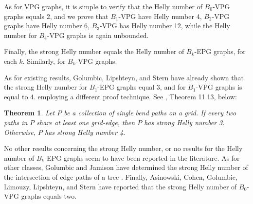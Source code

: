\documentclass[12pt]{article}
\newtheorem{theorem}{Theorem}
\begin{document}
As for VPG graphs, it is simple to verify that the Helly number of $B_0$-VPG graphs equals 2, and we prove that $B_1$-VPG have Helly number 4, $B_2$-VPG graphs have Helly number 6, $B_3$-VPG has Helly number 12, while the Helly number for $B_4$-VPG graphs is again unbounded. 

Finally, the strong Helly number equals the Helly number of $B_k$-EPG graphs, for each $k$. Similarly, for $B_k$-VPG graphs. 


As for existing results, 
Golumbic, Lipshteyn, and Stern \cite{golumbic2009}  have already shown that the strong Helly number for $B_1$-EPG graphs equal 3, and for $B_1$-VPG graphs is equal to 4. employing a different proof technique. See  \cite{golumbic2019edge}, Theorem 11.13, below:
\begin{theorem}\label{thm:golumbic2019edge}{\cite{golumbic2019edge}}
Let $P$ be a collection of single bend paths on a grid. If every two paths in $P$ share at least one grid-edge, then $P$ has strong Helly number 3. Otherwise, $P$ has strong Helly number 4.
\end{theorem}
No other results concerning the strong Helly number, or no results for the Helly number of $B_k$-EPG graphs seem to have been reported in the literature. As for other classes, Golumbic and Jamison have determined the strong Helly number of the intersection of edge paths of a tree \cite{golumbic1985}. Finally, Asinowski, Cohen, Golumbic, Limouzy, Lipshteyn, and Stern have reported that the strong Helly number of $B_0$-VPG graphs equals two.  





\end{document}
